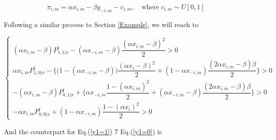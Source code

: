 \documentclass[draft]{article}
\begin{document}
$$\pi_{i,m} = \alpha x_{i,m} - \beta y_{-i,m} - c_{i,m}, \quad \mbox{where } c_{i,m} \sim U[0,1]$$


Following a similar process to Section \ref{Example}, we will reach to 

$$\begin{cases}
(\alpha x_{i,m} - \beta)P^i_{1, 1|x} - (\alpha x_{-i,m} - \beta)\dfrac{ (\alpha x_{i,m} - \beta)^2}{2} > 0\\
\alpha x_{i,m} P^i_{1, 0|x} - \{\big(1 - (\alpha x_{-i,m} - \beta)\big)\dfrac{(\alpha x_{i} - \beta)^2}{2} + (1 - \alpha x_{-i,m})\dfrac{(2\alpha x_{i,m} - \beta)\beta}{2}\} > 0\\
- (\alpha x_{i,m}- \beta)P^i_{0, 1|x} + \{\alpha x_{-i,m}\dfrac{1 - (\alpha x_{i,m})^2}{2} + (\alpha x_{-i,m}- \beta)\dfrac{(2\alpha x_{i,m} - \beta)\beta}{2} \}  > 0\\
- \alpha x_{i,m} P^i_{0, 0|x} + (1 - \alpha x_{-i,m})\dfrac{1 - (\alpha x_{i})^2}{2}> 0
\end{cases}$$

And the counterpart for Eq.(\ref{y1=1}) 7 Eq.(\ref{y1=0}) is 
\end{document}

